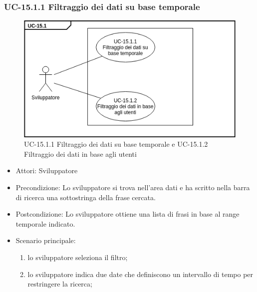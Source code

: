 	\subsubsection{UC-15.1.1 Filtraggio dei dati su base temporale}	
		\begin{figure}[h]
			\centering
			\includegraphics[scale=0.7]{images/UC-15_1_1.png}
			\caption{UC-15.1.1 Filtraggio dei dati su base temporale e UC-15.1.2 Filtraggio dei dati in base agli utenti}
		\end{figure}			
		\begin{itemize}
			\item Attori: Sviluppatore
			\item Precondizione: Lo sviluppatore si trova nell'area dati e ha scritto nella barra di ricerca una sottostringa della frase cercata.
			\item Postcondizione: Lo sviluppatore ottiene una lista di frasi in base al range temporale indicato.
			\item Scenario principale:
				\begin{enumerate}
					\item lo sviluppatore seleziona il filtro;
					\item lo sviluppatore indica due date che definiscono un intervallo di tempo per restringere la ricerca;
				\end{enumerate}
		\end{itemize}	
	
